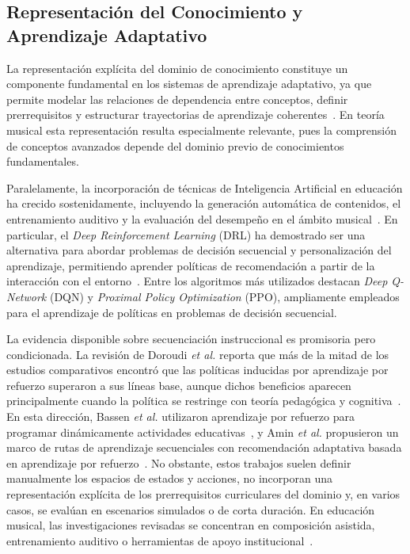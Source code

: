 \subsection{Representación del Conocimiento y Aprendizaje Adaptativo}

La representación explícita del dominio de conocimiento constituye un componente fundamental en los sistemas de aprendizaje adaptativo, ya que permite modelar las relaciones de dependencia entre conceptos, definir prerrequisitos y estructurar trayectorias de aprendizaje coherentes~\cite{manrique2019kg}. En teoría musical esta representación resulta especialmente relevante, pues la comprensión de conceptos avanzados depende del dominio previo de conocimientos fundamentales.

Paralelamente, la incorporación de técnicas de Inteligencia Artificial en educación ha crecido sostenidamente, incluyendo la generación automática de contenidos, el entrenamiento auditivo y la evaluación del desempeño en el ámbito musical~\cite{garcia2025}. En particular, el \textit{Deep Reinforcement Learning} (DRL) ha demostrado ser una alternativa para abordar problemas de decisión secuencial y personalización del aprendizaje, permitiendo aprender políticas de recomendación a partir de la interacción con el entorno~\cite{sutton2018reinforcement,mnih2015dqn}. Entre los algoritmos más utilizados destacan \textit{Deep Q-Network} (DQN) y \textit{Proximal Policy Optimization} (PPO), ampliamente empleados para el aprendizaje de políticas en problemas de decisión secuencial.

La evidencia disponible sobre secuenciación instruccional es promisoria pero condicionada. La revisión de Doroudi \textit{et al.} reporta que más de la mitad de los estudios comparativos encontró que las políticas inducidas por aprendizaje por refuerzo superaron a sus líneas base, aunque dichos beneficios aparecen principalmente cuando la política se restringe con teoría pedagógica y cognitiva~\cite{doroudi2019reward}. En esta dirección, Bassen \textit{et al.} utilizaron aprendizaje por refuerzo para programar dinámicamente actividades educativas~\cite{bassen2020reinforcement}, y Amin \textit{et al.} propusieron un marco de rutas de aprendizaje secuenciales con recomendación adaptativa basada en aprendizaje por refuerzo~\cite{amin2023smart}. No obstante, estos trabajos suelen definir manualmente los espacios de estados y acciones, no incorporan una representación explícita de los prerrequisitos curriculares del dominio y, en varios casos, se evalúan en escenarios simulados o de corta duración. En educación musical, las investigaciones revisadas se concentran en composición asistida, entrenamiento auditivo o herramientas de apoyo institucional~\cite{alrowais2025,li2025}.

